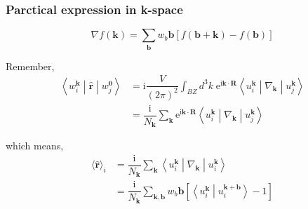 \documentclass{beamer}
\begin{document}
  \begin{frame}
    \frametitle{Parctical expression in k-space}

    \begin{equation*}
      \nabla{}f(\mathbf{k}) = \sum_{\mathbf{b}}w_b\mathbf{b}\left[f(\mathbf{b}+\mathbf{k}) - f(\mathbf{b})\right]
    \end{equation*}

    Remember,
    \begin{equation*}
      \begin{aligned}
        \left\langle{}w_i^{\mathbf{k}}\middle|\widehat{\mathbf{r}}\middle|w_j^{\mathbf{0}}\right\rangle &= \mathrm{i}\dfrac{V}{(2\pi)^2}\int_{BZ}d^3k\;\mathrm{e}^{\mathrm{i}\mathbf{k}\cdot\mathbf{R}}\left\langle{}u_i^{\mathbf{k}}\middle|\nabla_{\mathbf{k}}\middle|u_j^{\mathbf{k}}\right\rangle\\
        &= \dfrac{\mathrm{i}}{N_\mathbf{k}}\sum_\mathbf{k}\mathrm{e}^{\mathrm{i}\mathbf{k}\cdot\mathbf{R}}\left\langle{}u_i^{\mathbf{k}}\middle|\nabla_{\mathbf{k}}\middle|u_j^{\mathbf{k}}\right\rangle
      \end{aligned}
    \end{equation*}

    which means, 
    \begin{equation}
      \label{eq::rmeanink}
      \begin{aligned}
        \langle\widehat{\mathbf{r}}\rangle_i &= \dfrac{\mathrm{i}}{N_\mathbf{k}}\sum_{\mathbf{k}}\left\langle{}u_i^{\mathbf{k}}\middle|\nabla_\mathbf{k}\middle|u_i^{\mathbf{k}}\right\rangle\\
        &= \dfrac{\mathrm{i}}{N_\mathbf{k}}\sum_{\mathbf{k},\mathbf{b}}w_b\mathbf{b}\left[\left\langle{}u_i^{\mathbf{k}}\middle|u_i^{\mathbf{k}+\mathbf{b}}\right\rangle-1\right]
      \end{aligned}
    \end{equation}
  \end{frame}
\end{document}
